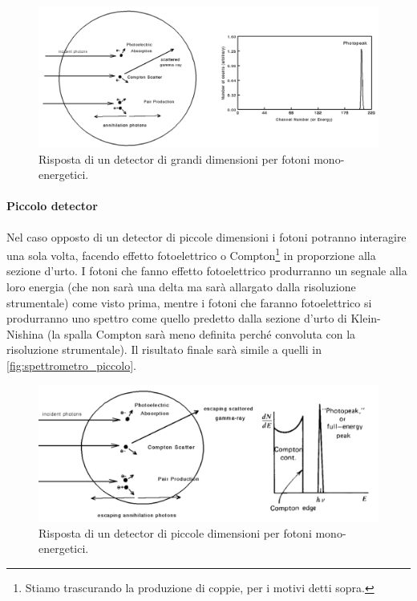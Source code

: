  \begin{figure}[h]
 	\centering
 	\includegraphics[width=\textwidth]{spettrometro_grosso}
 	\caption{\label{fig:spettrometro_grosso}
	Risposta di un detector di grandi dimensioni per fotoni mono-energetici.}
 \end{figure}

 \paragraph{Piccolo detector}Nel caso opposto di un detector di piccole dimensioni i fotoni potranno interagire una sola volta, facendo effetto fotoelettrico o Compton\footnote{Stiamo trascurando la produzione di coppie, per i motivi detti sopra.} in proporzione alla sezione d'urto. I fotoni che fanno effetto fotoelettrico produrranno un segnale alla loro energia (che non sarà una delta ma sarà allargato dalla risoluzione strumentale) come visto prima, mentre i fotoni che faranno fotoelettrico si produrranno uno spettro come quello predetto dalla sezione d'urto di Klein-Nishina (la spalla Compton sarà meno definita perché convoluta con la risoluzione strumentale).
Il risultato finale sarà simile a quelli in \autoref{fig:spettrometro_piccolo}.
 
  \begin{figure}[h]
 	\centering
 	\includegraphics[width=\textwidth]{spettrometro_piccolo}
 	\caption{\label{fig:spettrometro_piccolo}Risposta di un detector di piccole dimensioni per fotoni mono-energetici.}
 \end{figure}
 
